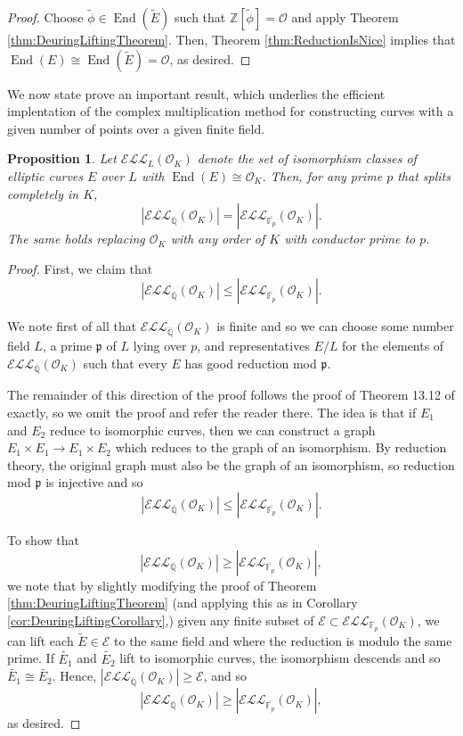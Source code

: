 \documentclass{amsart}
\newtheorem{prop}[thm]{Proposition}
\theoremstyle{definition}
\theoremstyle{remark}
\numberwithin{equation}{section}
\newcommand{\cE}{\mathcal E}
\newcommand{\cL}{\mathcal L}
\newcommand{\cO}{\mathcal O}
\newcommand{\fkp}{\mathfrak p}
\newcommand{\bbF}{\mathbb F}
\newcommand{\bbQ}{\mathbb Q}
\newcommand{\bbZ}{\mathbb Z}
\newcommand{\ELL}{\cE\cL\cL}
\DeclareMathOperator{\End}{End}
\begin{document}
\begin{proof}
Choose $\tilde{\phi} \in \End(\tilde{E})$ such that $\bbZ[\tilde{\phi}] = \cO$ and apply Theorem \ref{thm:DeuringLiftingTheorem}. Then, Theorem \ref{thm:ReductionIsNice} implies that $\End(E) \cong \End(\tilde{E}) = \cO$, as desired.
\end{proof}

 We now state prove an important result, which underlies the efficient implentation of the complex multiplication method for constructing curves with a given number of points over a given finite field. 
 
 \begin{prop} \label{prop:ReductionOfIsomClasses}
 Let $\ELL_{L}(\cO_{K})$ denote the set of isomorphism classes of elliptic curves $E$ over $L$ with $\End(E) \cong \cO_{K}$. Then, for any prime $p$ that splits completely in $K$, 
 \[
 |\ELL_{\overline{\bbQ}}(\cO_{K})| = |\ELL_{\overline{\bbF_{p}}}(\cO_{K})|.
 \]
 The same holds replacing $\cO_{K}$ with any order of $K$ with conductor prime to $p$.
 \end{prop}

\begin{proof}
First, we claim that 
 \[
 |\ELL_{\overline{\bbQ}}(\cO_{K})| \leq |\ELL_{\overline{\bbF_{p}}}(\cO_{K})|.
 \]
 
We note first of all that $\ELL_{\overline{\bbQ}}(\cO_{K})$ is finite and so we can choose some number field $L$, a prime $\fkp$ of $L$ lying over $p$, and representatives $E/L$ for the elements of $\ELL_{\overline{\bbQ}}(\cO_{K})$ such that every $E$ has good reduction mod $\fkp$. 

The remainder of this direction of the proof follows the proof of Theorem 13.12 of \cite{LangEF} exactly, so we omit the proof and refer the reader there. The idea is that if $E_{1}$ and $E_{2}$ reduce to isomorphic curves, then we can construct a graph $E_{1} \times E_{1} \to E_{1} \times E_{2}$ which reduces to the graph of an isomorphism. By reduction theory, the original graph must also be the graph of an isomorphism, so reduction mod $\fkp$ is injective and so
\[
 |\ELL_{\overline{\bbQ}}(\cO_{K})| \leq |\ELL_{\overline{\bbF_{p}}}(\cO_{K})|.
 \]

To show that 
\[
 |\ELL_{\overline{\bbQ}}(\cO_{K})| \geq |\ELL_{\overline{\bbF_{p}}}(\cO_{K})|,
 \]
we note that by slightly modifying the proof of Theorem \ref{thm:DeuringLiftingTheorem} (and applying this as in Corollary \ref{cor:DeuringLiftingCorollary},) given any finite subset of $\cE \subset \ELL_{\bbF_{p}}(\cO_{K})$, we can lift each $\tilde{E} \in \cE$ to the same field and where the reduction is modulo the same prime. If $\tilde{E_{1}}$ and $\tilde{E_{2}}$ lift to isomorphic curves, the isomorphism descends and so $\tilde{E_{1}} \cong \tilde{E_{2}}$. Hence, $|\ELL_{\overline{\bbQ}}(\cO_{K})| \geq \cE$, and so 
\[
 |\ELL_{\overline{\bbQ}}(\cO_{K})| \geq |\ELL_{\overline{\bbF_{p}}}(\cO_{K})|,
 \]
 as desired.
\end{proof}
\end{document}
